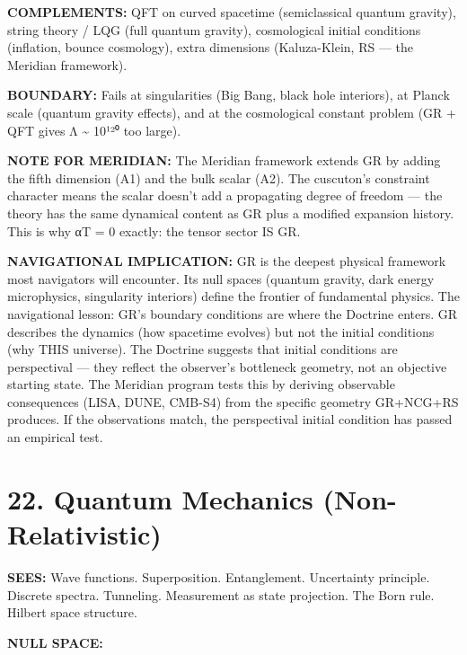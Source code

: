 \textbf{COMPLEMENTS:} QFT on curved spacetime (semiclassical quantum gravity), string theory / LQG (full quantum gravity), cosmological initial conditions (inflation, bounce cosmology), extra dimensions (Kaluza-Klein, RS — the Meridian framework).


\textbf{BOUNDARY:} Fails at singularities (Big Bang, black hole interiors), at Planck scale (quantum gravity effects), and at the cosmological constant problem (GR + QFT gives Λ \textasciitilde{} 10¹²⁰ too large).


\textbf{NOTE FOR MERIDIAN:} The Meridian framework extends GR by adding the fifth dimension (A1) and the bulk scalar (A2). The cuscuton's constraint character means the scalar doesn't add a propagating degree of freedom — the theory has the same dynamical content as GR plus a modified expansion history. This is why αT = 0 exactly: the tensor sector IS GR.


\textbf{NAVIGATIONAL IMPLICATION:} GR is the deepest physical framework most navigators will encounter. Its null spaces (quantum gravity, dark energy microphysics, singularity interiors) define the frontier of fundamental physics. The navigational lesson: GR's boundary conditions are where the Doctrine enters. GR describes the dynamics (how spacetime evolves) but not the initial conditions (why THIS universe). The Doctrine suggests that initial conditions are perspectival — they reflect the observer's bottleneck geometry, not an objective starting state. The Meridian program tests this by deriving observable consequences (LISA, DUNE, CMB-S4) from the specific geometry GR+NCG+RS produces. If the observations match, the perspectival initial condition has passed an empirical test.


\bigskip\noindent\makebox[\textwidth]{\color{rulegray}\rule{5cm}{0.3pt}}\bigskip


\section*{22. Quantum Mechanics (Non-Relativistic)}


\textbf{SEES:} Wave functions. Superposition. Entanglement. Uncertainty principle. Discrete spectra. Tunneling. Measurement as state projection. The Born rule. Hilbert space structure.


\textbf{NULL SPACE:}

